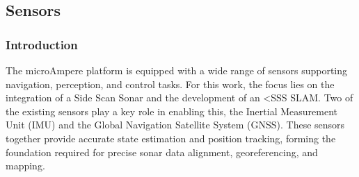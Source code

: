 \subsection{Sensors}
\subsubsection{Introduction}
The microAmpere platform is equipped with a wide range of sensors supporting navigation, perception, and control tasks. For this work, the focus lies on the integration of a Side Scan Sonar and the development of an <SSS SLAM. Two of the existing sensors play a key role in enabling this, the Inertial Measurement Unit (IMU) and the Global Navigation Satellite System (GNSS). These sensors together provide accurate state estimation and position tracking, forming the foundation required for precise sonar data alignment, georeferencing, and mapping.



